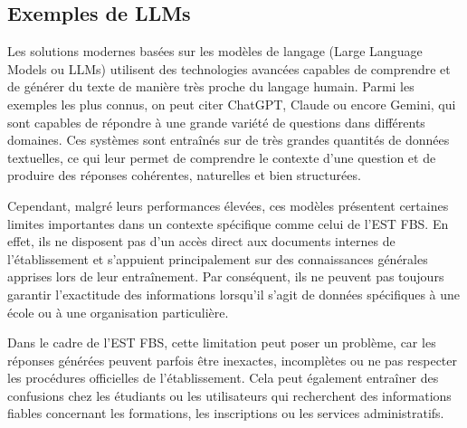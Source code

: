 \documentclass[12pt,a4paper]{report}
\begin{document}
\subsection{Exemples de LLMs}

Les solutions modernes basées sur les modèles de langage (Large Language Models ou LLMs) utilisent des technologies avancées capables de comprendre et de générer du texte de manière très proche du langage humain. Parmi les exemples les plus connus, on peut citer ChatGPT, Claude ou encore Gemini, qui sont capables de répondre à une grande variété de questions dans différents domaines. Ces systèmes sont entraînés sur de très grandes quantités de données textuelles, ce qui leur permet de comprendre le contexte d’une question et de produire des réponses cohérentes, naturelles et bien structurées.

Cependant, malgré leurs performances élevées, ces modèles présentent certaines limites importantes dans un contexte spécifique comme celui de l’EST FBS. En effet, ils ne disposent pas d’un accès direct aux documents internes de l’établissement et s’appuient principalement sur des connaissances générales apprises lors de leur entraînement. Par conséquent, ils ne peuvent pas toujours garantir l’exactitude des informations lorsqu’il s’agit de données spécifiques à une école ou à une organisation particulière.

Dans le cadre de l’EST FBS, cette limitation peut poser un problème, car les réponses générées peuvent parfois être inexactes, incomplètes ou ne pas respecter les procédures officielles de l’établissement. Cela peut également entraîner des confusions chez les étudiants ou les utilisateurs qui recherchent des informations fiables concernant les formations, les inscriptions ou les services administratifs.
\end{document}
